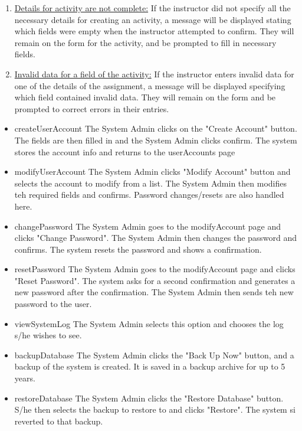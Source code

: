 \documentclass{article}
\begin{document}
\begin{enumerate}
	\item \underline{Details for activity are not complete:} If the instructor did not specify
			all the necessary details for creating an activity, a message will be displayed
			stating which fields were empty when the instructor attempted to confirm.
			They will remain on the form for the activity, and be prompted to fill in necessary
			fields.
	\item \underline{Invalid data for a field of the activity:} If the instructor enters invalid
			data for one of the details of the assignment, a message will be displayed
			specifying which field contained invalid data. They will remain on the form and
			be prompted to correct errors in their entries.
\end{enumerate}

\begin{itemize}
  \item createUserAccount
The System Admin clicks on the "Create Account" button. The fields are then filled in 
and the System Admin clicks confirm. The system stores the account info and returns to the userAccounts page
  \item modifyUserAccount
The System Admin clicks "Modify Account" button and selects the account to modify from a list. The System Admin 
then modifies teh required fields and confirms. Password changes/resets are also handled here.
  \item changePassword
The System Admin goes to the modifyAccount page and clicks "Change Password". The System Admin then changes 
the password and confirms. The system resets the password and shows a confirmation.
  \item resetPassword
The System Admin goes to the modifyAccount page and clicks "Reset Password". The system asks for a second confirmation 
and generates a new password after the confirmation. The System Admin then sends teh new password to the user.
  \item viewSystemLog
The System Admin selects this option and chooses the log s/he wishes to see.
  \item backupDatabase
The System Admin clicks the "Back Up Now" button, and a backup of the system is created. It is saved in a backup archive for up to 5 years.
  \item restoreDatabase
The System Admin clicks the "Restore Database" button. S/he then selects the backup to restore to and clicks "Restore". The system 
si reverted to that backup.
\end{itemize}
\end{document}
